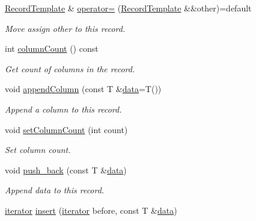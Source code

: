 \begin{DoxyCompactItemize}
\hyperlink{class_mdt_1_1_plain_text_1_1_record_template}{Record\+Template} \& \hyperlink{class_mdt_1_1_plain_text_1_1_record_template_a4e591d4288dad785a7ea1989cf855a17}{operator=} (\hyperlink{class_mdt_1_1_plain_text_1_1_record_template}{Record\+Template} \&\&other)=default
\begin{DoxyCompactList}\small\item\em Move assign {\itshape other} to this record. \end{DoxyCompactList}\item 
int \hyperlink{class_mdt_1_1_plain_text_1_1_record_template_a21045038e15420a6368501650f9564bc}{column\+Count} () const 
\begin{DoxyCompactList}\small\item\em Get count of columns in the record. \end{DoxyCompactList}\item 
void \hyperlink{class_mdt_1_1_plain_text_1_1_record_template_a18a781239310262f4c993018d7640070}{append\+Column} (const T \&\hyperlink{class_mdt_1_1_plain_text_1_1_record_template_aa6687a1e8e82a96fe3ae4d9fd79e8362}{data}=T())
\begin{DoxyCompactList}\small\item\em Append a column to this record. \end{DoxyCompactList}\item 
void \hyperlink{class_mdt_1_1_plain_text_1_1_record_template_a452bec26db031d65c72a97985ff9fd2a}{set\+Column\+Count} (int count)
\begin{DoxyCompactList}\small\item\em Set column count. \end{DoxyCompactList}\item 
void \hyperlink{class_mdt_1_1_plain_text_1_1_record_template_ab4c1c07ef4ee56f231bbc7cbdfb888b4}{push\+\_\+back} (const T \&\hyperlink{class_mdt_1_1_plain_text_1_1_record_template_aa6687a1e8e82a96fe3ae4d9fd79e8362}{data})
\begin{DoxyCompactList}\small\item\em Append data to this record. \end{DoxyCompactList}\item 
\hyperlink{class_mdt_1_1_plain_text_1_1_record_template_a0785bfc19bfa479d1097dbfcfdd03bef}{iterator} \hyperlink{class_mdt_1_1_plain_text_1_1_record_template_a473f1d26d8e87ccb714f802779e0b1e2}{insert} (\hyperlink{class_mdt_1_1_plain_text_1_1_record_template_a0785bfc19bfa479d1097dbfcfdd03bef}{iterator} before, const T \&\hyperlink{class_mdt_1_1_plain_text_1_1_record_template_aa6687a1e8e82a96fe3ae4d9fd79e8362}{data})

\end{DoxyCompactItemize}
